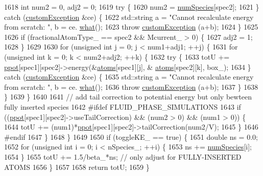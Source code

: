 \begin{DoxyCode}
1618             \textcolor{keywordtype}{int} num2 = 0, adj2 = 0;
1619             \textcolor{keywordflow}{try} \{
1620                 num2 = \hyperlink{classsim_system_a9eea865e6dc1cff377b1e79c4d9c23f0}{numSpecies}[spec2];
1621             \} \textcolor{keywordflow}{catch} (\hyperlink{classcustom_exception}{customException} &ce) \{
1622                 std::string a = \textcolor{stringliteral}{"Cannot recalculate energy from scratch: "}, b = ce.
      \hyperlink{classcustom_exception_aeb6ab5848b038adfc68fde86a512f691}{what}();
1623                 \textcolor{keywordflow}{throw} \hyperlink{classcustom_exception}{customException} (a+b);
1624             \}
1625 
1626             \textcolor{keywordflow}{if} (fractionalAtomType\_ == spec2 && Mcurrent\_ > 0) \{
1627                 adj2 = 1;
1628             \}
1629 
1630             \textcolor{keywordflow}{for} (\textcolor{keywordtype}{unsigned} \textcolor{keywordtype}{int} j = 0; j < num1+adj1; ++j) \{
1631                 \textcolor{keywordflow}{for} (\textcolor{keywordtype}{unsigned} \textcolor{keywordtype}{int} k = 0; k < num2+adj2; ++k) \{
1632                     \textcolor{keywordflow}{try} \{
1633                         totU += \hyperlink{classsim_system_ad2e290b5963f132e6a3a56cee35c8e9f}{ppot}[spec1][spec2]->energy(&\hyperlink{classsim_system_a90421b19082f7fb8fc23b7264b1161e4}{atoms}[spec1][j], &
      \hyperlink{classsim_system_a90421b19082f7fb8fc23b7264b1161e4}{atoms}[spec2][k], box\_);
1634                     \} \textcolor{keywordflow}{catch} (\hyperlink{classcustom_exception}{customException} &ce) \{
1635                         std::string a = \textcolor{stringliteral}{"Cannot recalculate energy from scratch: "}, b = ce.
      \hyperlink{classcustom_exception_aeb6ab5848b038adfc68fde86a512f691}{what}();
1636                         \textcolor{keywordflow}{throw} \hyperlink{classcustom_exception}{customException} (a+b);
1637                     \}
1638                 \}
1639             \}
1640 
1641             \textcolor{comment}{// add tail correction to potential energy but only bewteen fully inserted species}
1642 \textcolor{preprocessor}{#ifdef FLUID\_PHASE\_SIMULATIONS}
1643 \textcolor{preprocessor}{}            \textcolor{keywordflow}{if} ((\hyperlink{classsim_system_ad2e290b5963f132e6a3a56cee35c8e9f}{ppot}[spec1][spec2]->useTailCorrection) && (num2 > 0) && (num1 > 0)) \{
1644                 totU += (num1)*\hyperlink{classsim_system_ad2e290b5963f132e6a3a56cee35c8e9f}{ppot}[spec1][spec2]->tailCorrection(num2/V);
1645             \}
1646 \textcolor{preprocessor}{#endif}
1647 \textcolor{preprocessor}{}        \}
1648     \}
1649 
1650     \textcolor{keywordflow}{if} (toggleKE\_ == \textcolor{keyword}{true}) \{
1651         \textcolor{keywordtype}{double} ns = 0.0;
1652         \textcolor{keywordflow}{for} (\textcolor{keywordtype}{unsigned} \textcolor{keywordtype}{int} i = 0; i < nSpecies\_; ++i) \{
1653             ns += \hyperlink{classsim_system_a9eea865e6dc1cff377b1e79c4d9c23f0}{numSpecies}[i];
1654         \}
1655         totU += 1.5/beta\_*ns; \textcolor{comment}{// only adjust for FULLY-INSERTED ATOMS}
1656     \}
1657 
1658     \textcolor{keywordflow}{return} totU;
1659 \}
\end{DoxyCode}
